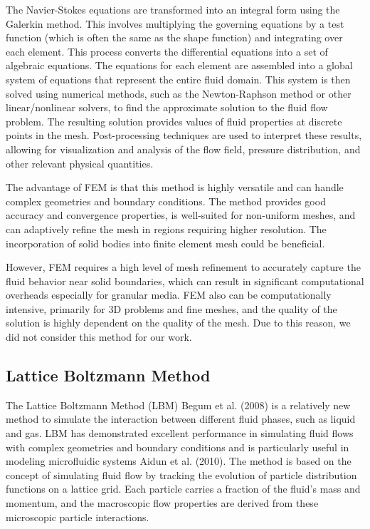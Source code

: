 The Navier-Stokes equations are transformed into an integral form using the Galerkin method. This involves multiplying the governing equations by a test function (which is often the same as the shape function) and integrating over each element. This process converts the differential equations into a set of algebraic equations. The equations for each element are assembled into a global system of equations that represent the entire fluid domain. This system is then solved using numerical methods, such as the Newton-Raphson method or other linear/nonlinear solvers, to find the approximate solution to the fluid flow problem. The resulting solution provides values of fluid properties at discrete points in the mesh. Post-processing techniques are used to interpret these results, allowing for visualization and analysis of the flow field, pressure distribution, and other relevant physical quantities.

The advantage of FEM is that this method is highly versatile and can handle complex geometries and boundary conditions. The method provides good accuracy and convergence properties, is well-suited for non-uniform meshes, and can adaptively refine the mesh in regions requiring higher resolution. The incorporation of solid bodies into finite element mesh could be beneficial.

However, FEM requires a high level of mesh refinement to accurately capture the fluid behavior near solid boundaries, which can result in significant computational overheads \cite{FEM_2} especially for granular media. FEM also can be computationally intensive, primarily for 3D problems and fine meshes, and the quality of the solution is highly dependent on the quality of the mesh. Due to this reason, we did not consider this method for our work.

\subsection{Lattice Boltzmann Method}
 
The Lattice Boltzmann Method (LBM) Begum et al. (2008)\cite{begum2008lattice} is a relatively new method to simulate the interaction between different fluid phases, such as liquid and gas. LBM has demonstrated excellent performance in simulating fluid flows with complex geometries and boundary conditions and is particularly useful in modeling microfluidic systems Aidun et al. (2010)\cite{aidun2010lattice}. The method is based on the concept of simulating fluid flow by tracking the evolution of particle distribution functions on a lattice grid. Each particle carries a fraction of the fluid's mass and momentum, and the macroscopic flow properties are derived from these microscopic particle interactions.

